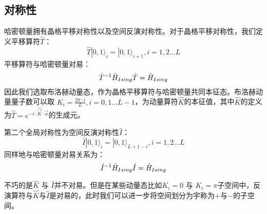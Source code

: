 \subsection{对称性}
哈密顿量拥有晶格平移对称性以及空间反演对称性。对于晶格平移对称性，我们定义平移算符$\hat{T}$：
\begin{equation}
	\hat{T} |0,1 \rangle_{i} =  |0,1 \rangle_{i+1}, i=1,2...L
\end{equation}
平移算符与哈密顿量对易：
\begin{equation}
	\hat{T}^{-1}\hat{H}_{Ising}\hat{T} = \hat{H}_{Ising}\\
\end{equation}
因此我们选取布洛赫动量态，作为晶格平移算符与哈密顿量共同本征态。布洛赫动量量子数可以取 $K_i=\frac{2\pi\cdot i}{L},i=0,1...L-1$，为动量算符$\hat{K}$的本征值，其中$\hat{K}$的定义为$\hat{T} = e^{-i\cdot\hat{\vec{K} }\cdot \vec{a}}$的生成元。

第二个全局对称性为空间反演对称性$\hat{I}$：
\begin{equation}
	\hat{I} |0,1 \rangle_{i} =  |0,1 \rangle_{L+1-i}, i=1,2...L
\end{equation}
同样地与哈密顿量对易关系为：
\begin{equation}
	\hat{I}^{-1}\hat{H}_{Ising}\hat{I} = \hat{H}_{Ising}\\
\end{equation}

不巧的是$\hat{K}$ 与 $\hat{I}$并不对易。但是在某些动量态比如$K_i=0$ 与 $K_i=\pi$子空间中，反演算符与$\hat{K}$与$\hat{I}$是对易的，此时我们可以进一步将空间划分为宇称为$+$与$-$的子空间。
\begin{comment}
在做了如上所述的块对角化之后，我们将要严格对角化的矩阵维度最大为动量宇称$KP=0+$
子空间的维度$L=18,KP=0+$，此时$D=7685$。
\end{comment}

